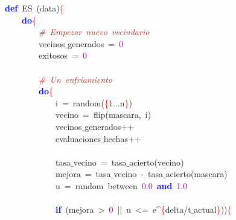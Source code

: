 \noindent
\mbox{}\textbf{\textcolor{Blue}{def}}\ ES\ \textcolor{BrickRed}{(}data\textcolor{BrickRed}{)}\textcolor{Red}{\{} \\
\mbox{}\ \ \ \ \textbf{\textcolor{Blue}{do}}\textcolor{Red}{\{} \\
\mbox{}\ \ \ \ \ \ \ \ \textit{\textcolor{Brown}{\#\ Empezar\ nuevo\ vecindario}} \\
\mbox{}\ \ \ \ \ \ \ \ vecinos$\_$generados\ \textcolor{BrickRed}{=}\ \textcolor{Purple}{0} \\
\mbox{}\ \ \ \ \ \ \ \ exitosos\ \textcolor{BrickRed}{=}\ \textcolor{Purple}{0} \\
\mbox{} \\
\mbox{}\ \ \ \ \ \ \ \ \textit{\textcolor{Brown}{\#\ Un\ enfriamiento}} \\
\mbox{}\ \ \ \ \ \ \ \ \textbf{\textcolor{Blue}{do}}\textcolor{Red}{\{} \\
\mbox{}\ \ \ \ \ \ \ \ \ \ \ \ i\ \textcolor{BrickRed}{=}\ random\textcolor{BrickRed}{(}\textcolor{Red}{\{}\textcolor{Purple}{1}\textcolor{BrickRed}{...}n\textcolor{Red}{\}}\textcolor{BrickRed}{)} \\
\mbox{}\ \ \ \ \ \ \ \ \ \ \ \ vecino\ \textcolor{BrickRed}{=}\ flip\textcolor{BrickRed}{(}mascara\textcolor{BrickRed}{,}\ i\textcolor{BrickRed}{)} \\
\mbox{}\ \ \ \ \ \ \ \ \ \ \ \ vecinos$\_$generados\textcolor{BrickRed}{++} \\
\mbox{}\ \ \ \ \ \ \ \ \ \ \ \ evaluaciones$\_$hechas\textcolor{BrickRed}{++} \\
\mbox{} \\
\mbox{}\ \ \ \ \ \ \ \ \ \ \ \ tasa$\_$vecino\ \textcolor{BrickRed}{=}\ tasa$\_$acierto\textcolor{BrickRed}{(}vecino\textcolor{BrickRed}{)} \\
\mbox{}\ \ \ \ \ \ \ \ \ \ \ \ mejora\ \textcolor{BrickRed}{=}\ tasa$\_$vecino\ \textcolor{BrickRed}{-}\ tasa$\_$acierto\textcolor{BrickRed}{(}mascara\textcolor{BrickRed}{)} \\
\mbox{}\ \ \ \ \ \ \ \ \ \ \ \ u\ \textcolor{BrickRed}{=}\ random\ between\ \textcolor{Purple}{0.0}\ \textbf{\textcolor{Blue}{and}}\ \textcolor{Purple}{1.0} \\
\mbox{} \\
\mbox{}\ \ \ \ \ \ \ \ \ \ \ \ \textbf{\textcolor{Blue}{if}}\ \textcolor{BrickRed}{(}mejora\ \textcolor{BrickRed}{\textgreater{}}\ \textcolor{Purple}{0}\ \textcolor{BrickRed}{$|$$|$}\ u\ \textcolor{BrickRed}{\textless{}=}\ e\textcolor{BrickRed}{\textasciicircum{}}\textcolor{Red}{\{}delta\textcolor{BrickRed}{/}t$\_$actual\textcolor{Red}{\}}\textcolor{BrickRed}{))}\textcolor{Red}{\{} \\
